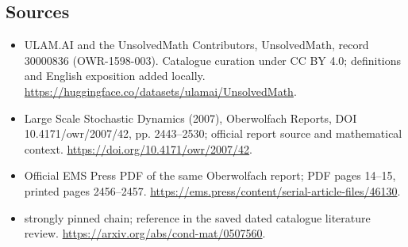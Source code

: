 \documentclass[11pt]{article}
\begin{document}
\subsection{Sources}
\begin{itemize}
\item[\hypertarget{source:30000836:1}{S1}] ULAM.AI and the UnsolvedMath Contributors, UnsolvedMath, record 30000836 (OWR-1598-003). Catalogue curation under CC BY 4.0; definitions and English exposition added locally.
\url{https://huggingface.co/datasets/ulamai/UnsolvedMath}.
\item[\hypertarget{source:30000836:2}{S2}] Large Scale Stochastic Dynamics (2007), Oberwolfach Reports, DOI 10.4171/owr/2007/42, pp. 2443--2530; official report source and mathematical context.
\url{https://doi.org/10.4171/owr/2007/42}.
\item[\hypertarget{source:30000836:3}{S3}] Official EMS Press PDF of the same Oberwolfach report; PDF pages 14--15, printed pages 2456--2457.
\url{https://ems.press/content/serial-article-files/46130}.
\item[\hypertarget{source:30000836:4}{S4}] strongly pinned chain; reference in the saved dated catalogue literature review.
\url{https://arxiv.org/abs/cond-mat/0507560}.
\end{itemize}
\label{end:30000836}
\end{document}
